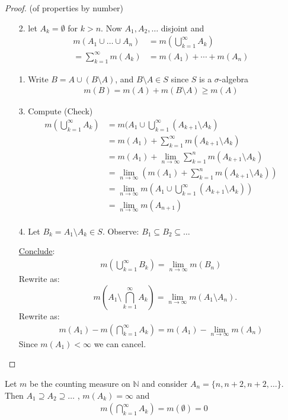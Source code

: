 \begin{proof}(of properties by number)
	\begin{enumerate}
		\item[2.] let $A_k = \emptyset$ for $k >n$. Now $A_1, A_2, \ldots$ disjoint and
			\begin{align*}
				m(A_1 \cup \ldots \cup A_n) &= m(\bigcup_{k=1}^{\infty} A_k ) \\
				= \sum_{k=1}^{\infty} m(A_k) &= m(A_1) + \cdots + m(A_n)
			\end{align*}
		\item[1.] Write $B = A \cup (B \setminus A)$, and $B \setminus A \in S$ since $S$ is a $\sigma$-algebra
			\begin{align*}
				m(B) = m(A) + m(B \setminus A) \geq m(A)
			\end{align*}
		\item[3.] Compute (Check)
			\begin{align*}
				m(\bigcup_{k=1}^{\infty} A_k) &= m(A_1 \cup \bigcup_{k=1}^{\infty} (A_{k+1} \setminus A_k) \\
											  &= m(A_1) + \sum_{k=1}^{\infty} m(A_{k+1} \setminus A_k) \\
											  &= m(A_1) + \lim_{n \to \infty}  \sum_{k=1}^{n} m(A_{k+1} \setminus A_k) \\
											  &= \lim_{n \to \infty} \left(m(A_1) + \sum_{k=1}^{n} m(A_{k+1} \setminus A_k) \right) \\
											  &= \lim_{n \to \infty} m \left(A_1 \cup \bigcup_{k=1}^{\infty} (A_{k+1} \setminus A_k) \right) \\
											  &= \lim_{n \to \infty} m (A_{n+1})  \\
			\end{align*}
		\item[4.] Let $B_k = A_1 \setminus A_k \in S$. Observe: $B_1 \subseteq B_2 \subseteq \ldots$

			\underline{Conclude}:
			\begin{align*}
				m(\bigcup_{k=1}^{\infty} B_k) = \lim_{n \to \infty} m(B_n)
			\end{align*}
			Rewrite as:
			\[
				\quad m(A_1 \setminus \bigcap_{k=1}^{\infty} A_k) =
				\lim_{n \to \infty} m(A_1 \setminus A_n).
			\]
			Rewrite as:
			\begin{align*}
				m(A_1) - m(\bigcap_{k=1}^{\infty} A_k) = m(A_1) - \lim_{n \to \infty} m(A_n)
			\end{align*}
			Since $m(A_1) < \infty$ we can cancel.
	\end{enumerate}
\end{proof}

\begin{example}
	Let $m$ be the counting measure on  $\mathbb{N}$ and consider $A_n = \{n, n+2, n+2, \ldots \}$.
	Then $A_1 \supseteq A_2 \supseteq \ldots$ , $m(A_k) = \infty$ and
	\begin{align*}
		m(\bigcap_{k=1}^{\infty} A_k ) = m(\emptyset) = 0
	\end{align*}
\end{example}

